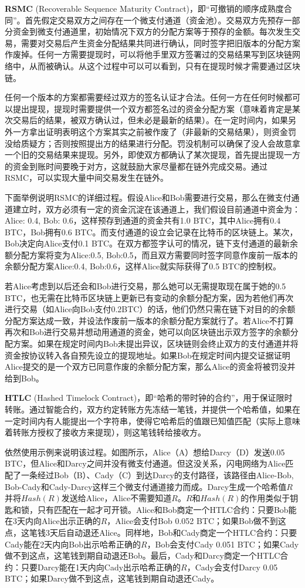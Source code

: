 \documentclass[12pt,a4paper]{article}
\begin{document}
\textbf{RSMC} (Recoverable Sequence Maturity Contract)，即“可撤销的顺序成熟度合同”。首先假定交易双方之间存在一个微支付通道（资金池）。交易双方先预存一部分资金到微支付通道里，初始情况下双方的分配方案等于预存的金额。每次发生交易，需要对交易后产生资金分配结果共同进行确认，同时签字把旧版本的分配方案作废掉。任何一方需要提现时，可以将他手里双方签署过的交易结果写到区块链网络中，从而被确认。从这个过程中可以可以看到，只有在提现时候才需要通过区块链。

任何一个版本的方案都需要经过双方的签名认证才合法。任何一方在任何时候都可以提出提现，提现时需要提供一个双方都签名过的资金分配方案（意味着肯定是某次交易后的结果，被双方确认过，但未必是最新的结果）。在一定时间内，如果另外一方拿出证明表明这个方案其实之前被作废了（非最新的交易结果），则资金罚没给质疑方；否则按照提出方的结果进行分配。罚没机制可以确保了没人会故意拿一个旧的交易结果来提现。另外，即使双方都确认了某次提现，首先提出提现一方的资金到账时间要晚于对方，这就鼓励大家尽量都在链外完成交易。通过 RSMC，可以实现大量中间交易发生在链外。

下面举例说明RSMC的详细过程。假设Alice和Bob需要进行交易，那么在微支付通道建立时，双方必须有一定的资金沉淀在该通道上，我们假设目前通道中资金为：Alice: 0.4, Bob: 0.6，这样预存到通道的资金共有1.0 BTC，其中Alice拥有0.4 BTC，Bob拥有0.6 BTC。而支付通道的设立会记录在比特币的区块链上。某次，Bob决定向Alice支付0.1 BTC。在双方都签字认可的情况，链下支付通道的最新余额分配方案将变为{Alice:0.5, Bob:0.5}，而且双方需要同时签字同意作废前一版本的余额分配方案{Alice:0.4, Bob:0.6}，这样Alice就实际获得了0.5 BTC的控制权。

若Alice考虑到以后还会和Bob进行交易，那么她可以无需提取现在属于她的0.5 BTC，也无需在比特币区块链上更新已有变动的余额分配方案，因为若他们再次进行交易（如Alice向Bob支付0.2BTC）的话，他们仍然只需在链下对目的的余额分配方案达成一致，并设法作废前一版本的余额分配方案就行了。若Alice不打算再次和Bob进行交易并想动用通道的资金，她可以向区块链出示双方签字的余额分配方案。如果在规定时间内Bob未提出异议，区块链则会终止双方的支付通道并将资金按协议转入各自预先设立的提现地址。如果Bob在规定时间内提交证据证明Alice提交的是一个双方已同意作废的余额分配方案，那么Alice的资金将被罚没并给到Bob。

\textbf{HTLC} (Hashed Timelock Contract)，即“哈希的带时钟的合约”，用于保证限时转账。通过智能合约，双方约定转账方先冻结一笔钱，并提供一个哈希值，如果在一定时间内有人能提出一个字符串，使得它哈希后的值跟已知值匹配（实际上意味着转账方授权了接收方来提现），则这笔钱转给接收方。

依然使用示例来说明该过程。如图所示，Alice（A）想给Darcy（D）发送0.05 BTC，但Alice和Darcy之间并没有微支付通道。但这没关系，闪电网络为Alice匹配了一条经过Bob（B）、Cady（C）到达Darcy的支付路径，该路径由Alice-Bob, Bob-Cady和Cady-Darcy这样三个微支付通道接力而成。Darcy生成一个哈希值$R$并将$Hash(R)$发送给Alice，Alice不需要知道$R$。$R$和$Hash(R)$的作用类似于钥匙和锁，只有匹配在一起才可开锁。Alice和Bob商定一个HTLC合约：只要Bob能在3天内向Alice出示正确的$R$，Alice会支付Bob 0.052 BTC；如果Bob做不到这点，这笔钱3天后自动退还Alice。同样地，Bob和Cady商定一个HTLC合约：只要Cady能在2天内向Bob出示哈希正确的$R$，Bob会支付Cady 0.051 BTC；如果Cady做不到这点，这笔钱到期自动退还Bob。最后，Cady和Darcy商定一个HTLC合约：只要Darcy能在1天内向Cady出示哈希正确的$R$，Cady会支付Darcy 0.05 BTC；如果Darcy做不到这点，这笔钱到期自动退还Cady。
\end{document}
